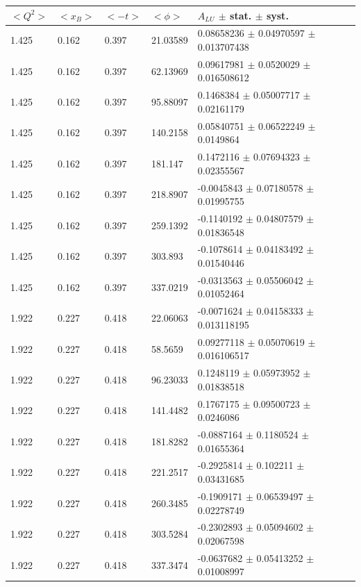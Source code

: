 \begin{table}[!h]
   \begin{center}
      \begin{tabular}{||l|l|l|l|l||}
         \hline
 $<Q^{2}>$ & $<x_{B}>$ & $<-t>$ & $<\phi>$ & $A_{LU}$ $\pm$ stat. $\pm$ syst.\\
         \hline 
  1.425 & 0.162 & 0.397 &   21.03589  &  0.08658236   $\pm$  0.04970597   $\pm$  0.013707438    \\
  1.425 & 0.162 & 0.397 &   62.13969  &  0.09617981   $\pm$  0.0520029    $\pm$  0.016508612    \\
  1.425 & 0.162 & 0.397 &   95.88097  &  0.1468384    $\pm$  0.05007717   $\pm$  0.02161179     \\
  1.425 & 0.162 & 0.397 &   140.2158  &  0.05840751   $\pm$  0.06522249   $\pm$  0.0149864      \\
  1.425 & 0.162 & 0.397 &   181.147   &  0.1472116    $\pm$  0.07694323   $\pm$  0.02355567     \\
  1.425 & 0.162 & 0.397 &   218.8907  &  -0.0045843   $\pm$  0.07180578   $\pm$  0.01995755     \\
  1.425 & 0.162 & 0.397 &   259.1392  &  -0.1140192   $\pm$  0.04807579   $\pm$  0.01836548     \\
  1.425 & 0.162 & 0.397 &   303.893   &  -0.1078614   $\pm$  0.04183492   $\pm$  0.01540446     \\
  1.425 & 0.162 & 0.397 &   337.0219  &  -0.0313563   $\pm$  0.05506042   $\pm$  0.01052464     \\
  \hline
                                                                       
  1.922 & 0.227 & 0.418 &   22.06063  &  -0.0071624   $\pm$  0.04158333   $\pm$  0.013118195    \\
  1.922 & 0.227 & 0.418 &   58.5659   &  0.09277118   $\pm$  0.05070619   $\pm$  0.016106517    \\
  1.922 & 0.227 & 0.418 &   96.23033  &  0.1248119    $\pm$  0.05973952   $\pm$  0.01838518     \\
  1.922 & 0.227 & 0.418 &   141.4482  &  0.1767175    $\pm$  0.09500723   $\pm$  0.0246086      \\
  1.922 & 0.227 & 0.418 &   181.8282  &  -0.0887164   $\pm$  0.1180524    $\pm$  0.01655364     \\
  1.922 & 0.227 & 0.418 &   221.2517  &  -0.2925814   $\pm$  0.102211     $\pm$  0.03431685     \\
  1.922 & 0.227 & 0.418 &   260.3485  &  -0.1909171   $\pm$  0.06539497   $\pm$  0.02278749     \\
  1.922 & 0.227 & 0.418 &   303.5284  &  -0.2302893   $\pm$  0.05094602   $\pm$  0.02067598     \\
  1.922 & 0.227 & 0.418 &   337.3474  &  -0.0637682   $\pm$  0.05413252   $\pm$  0.01008997     \\
  \hline
                                                                       

\end{tabular}
\end{center}
\end{table}
